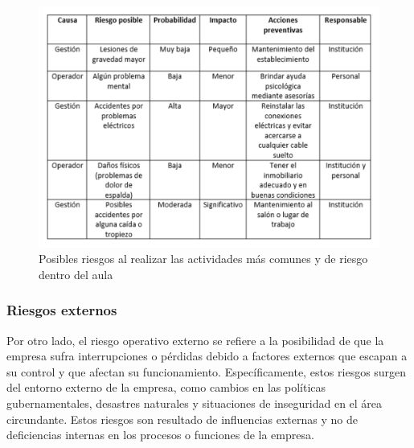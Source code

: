     \begin{figure}[H]
        \centering
        \includegraphics[scale=0.25]{30/img/PosiblesRiesgosInt.pdf}
        \caption{Posibles riesgos al realizar las actividades más comunes y de riesgo dentro del aula}
    \end{figure}
    \subsubsection{Riesgos externos}
    Por otro lado, el riesgo operativo externo se refiere a la posibilidad de que la empresa sufra interrupciones o pérdidas debido a factores externos que escapan a su control y que afectan su funcionamiento. Específicamente, estos riesgos surgen del entorno externo de la empresa, como cambios en las políticas gubernamentales, desastres naturales y situaciones de inseguridad en el área circundante. Estos riesgos son resultado de influencias externas y no de deficiencias internas en los procesos o funciones de la empresa.
    
